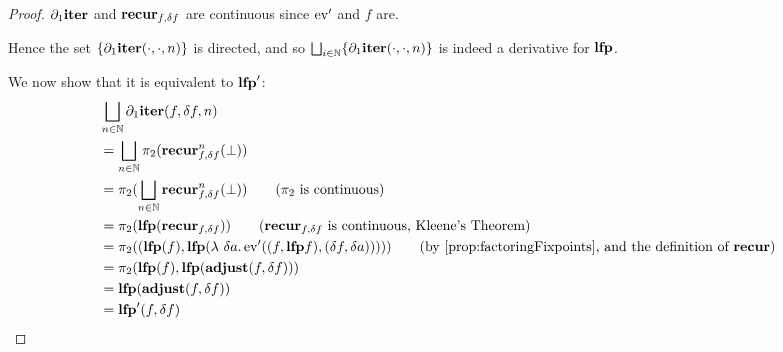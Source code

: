 \leastFixpointDerivatives*
\begin{proof}
  \label{prf:leastFixpointDerivatives}
  $\partial_1{\mathbf{iter}}$ and $\mathbf{recur}_{f, \delta f}$ are continuous since
  $\operatorname{ev}'$ and $f$ are.

  Hence the set $\{ \partial_1{\mathbf{iter}}(\cdot, \cdot, n) \}$ is directed, and so $\bigsqcup_{i \in \mathbb{N}}
  \{ \partial_1{\mathbf{iter}}(\cdot, \cdot, n) \}$ is indeed a derivative for $\mathbf{lfp}$.

  We now show that it is equivalent to $\mathbf{lfp}'$:
  \begin{align*}
    &\bigsqcup_{n \in \NN} \partial_1{\iter}(f, \change{f}, n)\\
    &=\bigsqcup_{n \in \NN} \pi_2(\nextiter_{f, \change{f}}^n(\bot))\\
    &=\pi_2(\bigsqcup_{n \in \NN} \nextiter_{f, \change{f}}^n(\bot)) \tag{$\pi_2$ is continuous}\\
    &= \pi_2 (\lfp(\nextiter_{f, \change{f}})) \tag{$\nextiter_{f, \change{f}}$ is continuous, Kleene's Theorem}\\
    &= \pi_2 ((\lfp(f), \lfp (\lambda\ \change{a}. \derive{\ev}((f, \lfp f), (\change{f}, \change{a})))))
    \tag{by \cref{prop:factoringFixpoints}, and the definition of $\nextiter$}\\
    &= \pi_2 (\lfp(f), \lfp(\adjust(f, \change{f})))\\
    &= \lfp(\adjust(f, \change{f}))\\
    &= \derive{\lfp}(f, \change{f})
  \end{align*}
\end{proof}


